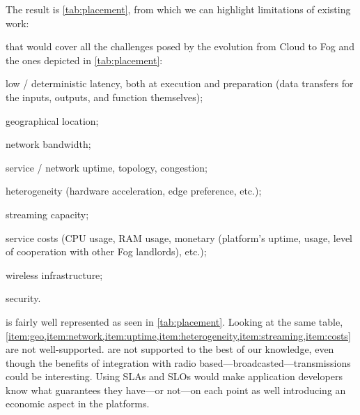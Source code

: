 The result is \cref{tab:placement}, from which we can highlight limitations of existing work:

\begin{description}[leftmargin=10pt]
	\item[Lack of \acrfullpl{SLA}] that would cover all the challenges posed by the evolution from Cloud to Fog \cite{chiang_fog_2016, bonomi_fog_2012} and the ones depicted in \cref{tab:placement}:
		\begin{enumerate*}[(1)]
			\item \label{item:latency} low / deterministic latency, both at execution and preparation (data transfers for the inputs, outputs, and function themselves);
			\item \label{item:geo} geographical location;
			\item \label{item:network} network bandwidth;
			\item \label{item:uptime} service / network uptime, topology, congestion;
			\item \label{item:heterogeneity} heterogeneity (hardware acceleration, edge preference, etc.);
			\item \label{item:streaming} streaming capacity;
			\item \label{item:costs} service costs (CPU usage, RAM usage, monetary (platform's uptime, usage, level of cooperation with other Fog landlords), etc.);
			\item \label{item:wireless} wireless infrastructure;
			\item \label{item:security} security.
		\end{enumerate*}
		 is fairly well represented as seen in \cref{tab:placement}. Looking at the same table, \cref{item:geo,item:network,item:uptime,item:heterogeneity,item:streaming,item:costs} are not well-supported.  are not supported to the best of our knowledge, even though the benefits of integration with radio based—broadcasted—transmissions could be interesting. Using \glspl{SLA} and \glspl{SLO} would make application developers know what guarantees they have—or not—on each point as well introducing an economic aspect in the platforms.


\end{description}
